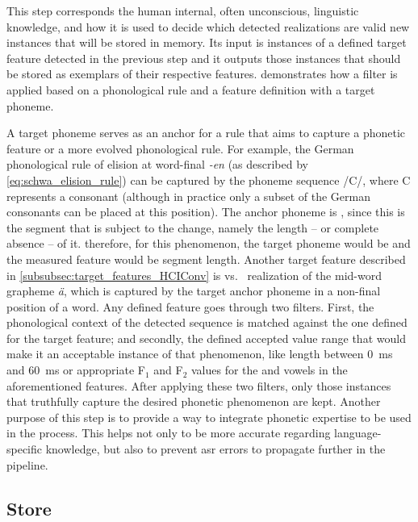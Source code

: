 This step corresponds the human internal, often unconscious, linguistic knowledge, and how it is used to decide which detected realizations are valid new instances that will be stored in memory.
Its input is instances of a defined target feature detected in the previous step and it outputs those instances that should be stored as exemplars of their respective features.
 demonstrates how a filter is applied based on a phonological rule and a feature definition with a target phoneme.

A target phoneme serves as an anchor for a rule that aims to capture a phonetic feature or a more evolved phonological rule.
For example, the German phonological rule of \textipa{[@]} elision at word-final \emph{-en} (as described by \cref{eq:schwa_elision_rule}) can be captured by the phoneme sequence /C/, where C represents a consonant (although in practice only a subset of the German consonants can be placed at this position).
The anchor phoneme is \textipa{[@]}, since this is the segment that is subject to the change, namely the length -- or complete absence -- of it.
therefore, for this phenomenon, the target phoneme would be \textipa{[@]} and the measured feature would be segment length.
Another target feature described in \cref{subsubsec:target_features_HCIConv} is \textipa{[e:]} vs.\ \textipa{[E:]} realization of the mid-word grapheme \emph{ä}, which is captured by the target anchor phoneme \textipa{[E]} in a non-final position of a word.
Any defined feature goes through two filters.
First, the phonological context of the detected sequence is matched against the one defined for the target feature; and secondly, the defined accepted value range that would make it an acceptable instance of that phenomenon, like \textipa{[@]} length between \SI{0}{\milli\second} and \SI{60}{\milli\second} or appropriate F$_1$ and F$_2$ values for the \textipa{[e:]} and \textipa{[E:]} vowels in the aforementioned features.
After applying these two filters, only those instances that truthfully capture the desired phonetic phenomenon are kept.
Another purpose of this step is to provide a way to integrate phonetic expertise to be used in the process.
This helps not only to be more accurate regarding language-specific knowledge, but also to prevent \ac{asr} errors to propagate further in the pipeline.

\subsection{Store}
\label{subsec:store}

